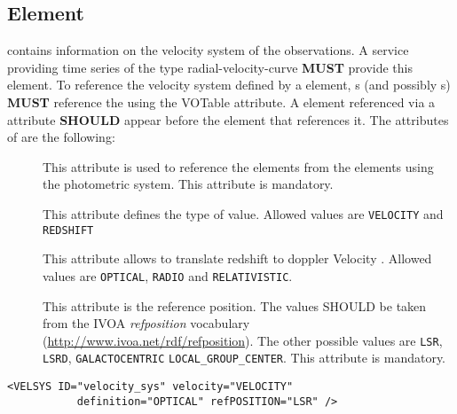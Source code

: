\subsection{ Element}
 contains information on the velocity system of the observations. A service providing time series of the type radial-velocity-curve \textbf{MUST} provide this element. To reference the velocity system defined by a  element, s (and possibly s) \textbf{MUST} reference the  using the VOTable  attribute. A  element referenced via a  attribute \textbf{SHOULD} appear before the element that references it. The attributes of  are the following: 

\begin{description}
     \item[] This attribute is used to reference the  elements from the elements using the photometric system. This attribute is mandatory. 
     \item[] This attribute defines the type of value. Allowed values are \verb|VELOCITY| and \verb|REDSHIFT|
     \item[] This attribute allows to translate redshift to doppler Velocity \cite{STC}. Allowed values are \verb|OPTICAL|, \verb|RADIO| and \verb|RELATIVISTIC|. 
     \item[] This attribute is the reference position. The values SHOULD be taken from the IVOA \emph{refposition} vocabulary (\url{http://www.ivoa.net/rdf/refposition}). The other possible values are \verb|LSR|, \verb|LSRD|, \verb|GALACTOCENTRIC| \verb|LOCAL_GROUP_CENTER|. This attribute is mandatory.
\end{description}

\noindent
\begingroup\footnotesize
\begin{tcolorbox}
\begin{verbatim}
<VELSYS ID="velocity_sys" velocity="VELOCITY" 
           definition="OPTICAL" refPOSITION="LSR" />
\end{verbatim}
\end{tcolorbox}
\endgroup


